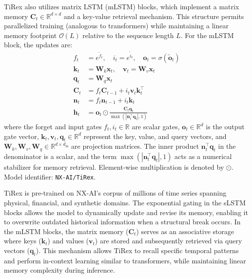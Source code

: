 TiRex also utilizes matrix LSTM (mLSTM) blocks, which implement a matrix memory $\mathbf{C}_t \in \mathbb{R}^{d \times d}$ and a key-value retrieval mechanism. This structure permits parallelized training (analogous to transformers) while maintaining a linear memory footprint $\mathcal{O}(L)$ relative to the sequence length $L$. For the mLSTM block, the updates are:
\begin{align}
f_t &= e^{\tilde{f}_t}, \quad i_t = e^{\tilde{i}_t}, \quad \mathbf{o}_t = \sigma(\tilde{\mathbf{o}}_t) \\
\mathbf{k}_t &= \mathbf{W}_k \mathbf{x}_t, \quad \mathbf{v}_t = \mathbf{W}_v \mathbf{x}_t \\
\mathbf{q}_t &= \mathbf{W}_q \mathbf{x}_t \\
\mathbf{C}_t &= f_t \mathbf{C}_{t-1} + i_t \mathbf{v}_t \mathbf{k}_t^\top \\
\mathbf{n}_t &= f_t \mathbf{n}_{t-1} + i_t \mathbf{k}_t \\
\mathbf{h}_t &= \mathbf{o}_t \odot \frac{\mathbf{C}_t \mathbf{q}_t}{\max\left(\left|\mathbf{n}_t^\top \mathbf{q}_t\right|, 1\right)}
\end{align}
where the forget and input gates $f_t, i_t \in \mathbb{R}$ are scalar gates, $\mathbf{o}_t \in \mathbb{R}^d$ is the output gate vector, $\mathbf{k}_t, \mathbf{v}_t, \mathbf{q}_t \in \mathbb{R}^d$ represent the key, value, and query vectors, and $\mathbf{W}_k, \mathbf{W}_v, \mathbf{W}_q \in \mathbb{R}^{d \times d_{\text{in}}}$ are projection matrices. The inner product $\mathbf{n}_t^\top \mathbf{q}_t$ in the denominator is a scalar, and the term $\max\left(\left|\mathbf{n}_t^\top \mathbf{q}_t\right|, 1\right)$ acts as a numerical stabilizer for memory retrieval. Element-wise multiplication is denoted by $\odot$. Model identifier: \texttt{NX-AI/TiRex}.

TiRex is pre-trained on NX-AI's corpus of millions of time series spanning physical, financial, and synthetic domains. The exponential gating in the sLSTM blocks allows the model to dynamically update and revise its memory, enabling it to overwrite outdated historical information when a structural break occurs. In the mLSTM blocks, the matrix memory ($\mathbf{C}_t$) serves as an associative storage where keys ($\mathbf{k}_t$) and values ($\mathbf{v}_t$) are stored and subsequently retrieved via query vectors ($\mathbf{q}_t$). This mechanism allows TiRex to recall specific temporal patterns and perform in-context learning similar to transformers, while maintaining linear memory complexity during inference.

